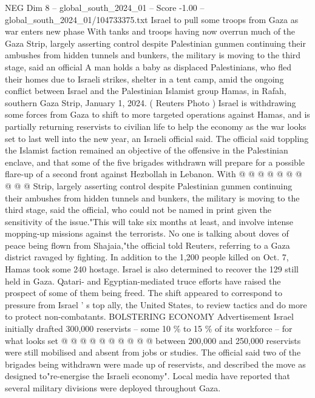 \begin{textsample}{NEG Dim 8 – global\_south\_2024\_01 – Score -1.00 – global\_south\_2024\_01/104733375.txt}  \label{ex:f8_neg_056}
Israel to pull some troops from Gaza as war enters new phase With tanks and troops having now overrun much of the Gaza Strip, largely asserting control despite Palestinian gunmen continuing their ambushes from hidden tunnels and bunkers, the military is moving to the third stage, said an official A man holds a baby as displaced Palestinians, who fled their homes due to Israeli strikes, shelter in a tent camp, amid the ongoing conflict between Israel and the Palestinian Islamist group Hamas, in Rafah, southern Gaza Strip, January 1, 2024. ( Reuters Photo ) Israel is withdrawing some forces from Gaza to shift to more targeted operations against Hamas, and is partially returning reservists to civilian life to help the economy as the war looks set to last well into the new year, an Israeli official said.
The official said toppling the Islamist faction remained an objective of the offensive in the Palestinian enclave, and that some of the five brigades withdrawn will prepare for a possible flare-up of a second front against Hezbollah in Lebanon.
With @ @ @ @ @ @ @ @ @ @ Strip, largely asserting control despite Palestinian gunmen continuing their ambushes from hidden tunnels and bunkers, the military is moving to the third stage, said the official, who could not be named in print given the sensitivity of the issue."This will take six months at least, and involve intense mopping-up missions against the terrorists.
No one is talking about doves of peace being flown from Shajaia,"the official told Reuters, referring to a Gaza district ravaged by fighting.
In addition to the 1,200 people killed on Oct. 7, Hamas took some 240 hostage.
Israel is also determined to recover the 129 still held in Gaza.
Qatari- and Egyptian-mediated truce efforts have raised the prospect of some of them being freed.
The shift appeared to correspond to pressure from Israel ' s top ally, the United States, to review tactics and do more to protect non-combatants.
BOLSTERING ECONOMY Advertisement Israel initially drafted 300,000 reservists -- some 10 \% to 15 \% of its workforce -- for what looks set @ @ @ @ @ @ @ @ @ @ between 200,000 and 250,000 reservists were still mobilised and absent from jobs or studies.
The official said two of the brigades being withdrawn were made up of reservists, and described the move as designed to"re-energise the Israeli economy".
Local media have reported that several military divisions were deployed throughout Gaza.

\end{textsample}
